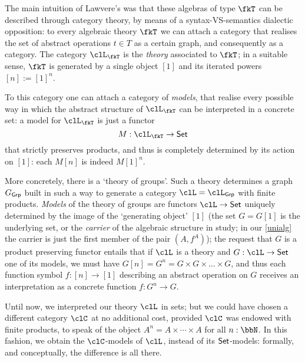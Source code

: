 The main intuition of Lawvere's \cite{lawvere1963functorial} was that these algebras of type $\fkT$ can be described through category theory, by means of a syntax-VS-semantics dialectic opposition: to every algebraic theory $\fkT$ we can attach a category that realises the set of abstract operations $t\in T$ as a certain graph, and consequently as a category. The category $\clL_\fkT$ is the \emph{theory} associated to $\fkT$; in a suitable sense, $\fkT$ is generated by a single object $[1]$ and its iterated powers $[n] := [1]^n$.

To this category one can attach a category of \emph{models}, that realise every possible way in which the abstract structure of $\clL_\fkT$ can be interpreted in a concrete set: a model for $\clL_\fkT$ is just a functor
\[
	M : \clL_\fkT \to \Set
\]
that strictly preserves products, and thus is completely determined by its action on $[1]$: each $M[n]$ is indeed $M[1]^n$.

\begin{remark}\label{rmk_explicit_theoer}
	More concretely, there is a `theory of groups'. Such a theory determines a graph $G_{\mathsf{Grp}}$ built in such a way to generate a category $\clL=\clL_{\cate{Grp}}$ with finite products. \emph{Models} of the theory of groups are functors $\clL \to \Set$ uniquely determined by the image of the `generating object' $[1]$ (the set $G=G[1]$ is the underlying set, or the \emph{carrier} of the algebraic structure in study; in our \autoref{unialg} the carrier is just the first member of the pair $(A,f^A)$); the request that $G$ is a product preserving functor entails that if $\clL$ is a theory and $G: \clL \to \Set$ one of its models, we must have $G[n]=G^n = G \times G \times\dots\times G$, and thus each function symbol $f: [n]\to [1]$ describing an abstract operation on $G$ receives an interpretation as a concrete function $f: G^n \to G$.
\end{remark}
Until now, we interpreted our theory $\clL$ in sets; but we could have chosen a different category $\clC$ at no additional cost, provided $\clC$ was endowed with finite products, to speak of the object $A^n = A\times \cdots\times A$ for all $n: \bbN$. In this fashion, we obtain the $\clC$-models of $\clL$, instead of its $\mathsf{Set}$-models: formally, and conceptually, the difference is all there.

